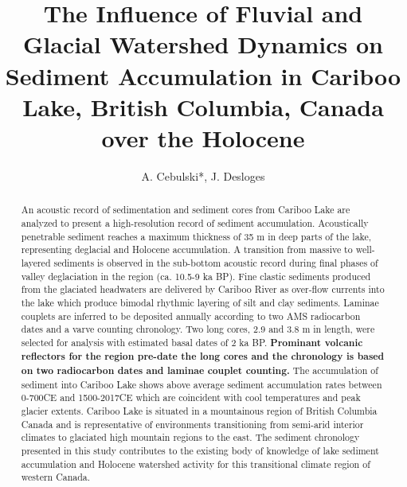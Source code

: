 \documentclass[Royal,times,doublespace,sageh]{sagej}
\begin{document}

\title{The Influence of Fluvial and Glacial Watershed Dynamics on
Sediment Accumulation in Cariboo Lake, British Columbia, Canada over the
Holocene}


\author{A. Cebulski*, J. Desloges}




\begin{abstract}
An acoustic record of sedimentation and sediment cores from Cariboo Lake
are analyzed to present a high-resolution record of sediment
accumulation. Acoustically penetrable sediment reaches a maximum
thickness of 35 m in deep parts of the lake, representing deglacial and
Holocene accumulation. A transition from massive to well-layered
sediments is observed in the sub-bottom acoustic record during final
phases of valley deglaciation in the region (ca. 10.5-9 ka BP). Fine
clastic sediments produced from the glaciated headwaters are delivered
by Cariboo River as over-flow currents into the lake which produce
bimodal rhythmic layering of silt and clay sediments. Laminae couplets
are inferred to be deposited annually according to two AMS radiocarbon
dates and a varve counting chronology. Two long cores, 2.9 and 3.8 m in
length, were selected for analysis with estimated basal dates of 2 ka
BP. \textbf{Prominant volcanic reflectors for the region pre-date the
long cores and the chronology is based on two radiocarbon dates and
laminae couplet counting.} The accumulation of sediment into Cariboo
Lake shows above average sediment accumulation rates between 0-700CE and
1500-2017CE which are coincident with cool temperatures and peak glacier
extents. Cariboo Lake is situated in a mountainous region of British
Columbia Canada and is representative of environments transitioning from
semi-arid interior climates to glaciated high mountain regions to the
east. The sediment chronology presented in this study contributes to the
existing body of knowledge of lake sediment accumulation and Holocene
watershed activity for this transitional climate region of western
Canada.
\end{abstract}
\end{document}
